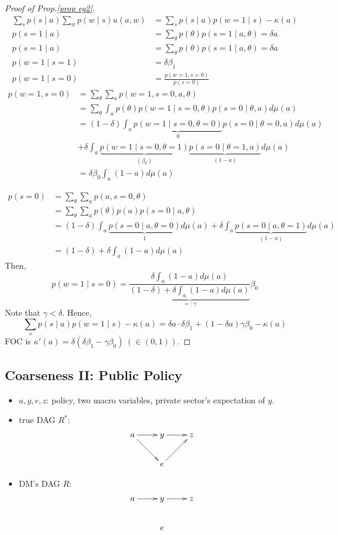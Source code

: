 \documentclass[11pt,a4paper,dvipdfmx]{article}
\theoremstyle{plain}
\begin{document}
\begin{proof}[Proof of Prop.\ref{prop eg2}]
\begin{align*}
\sum_s p(s \mid a) \sum_w p(w \mid s) u(a, w) &= \sum_s p(s \mid a) p(w=1 \mid s) - \kappa(a) \\
p(s=1 \mid a)
&= \sum_\theta p(\theta) p(s=1 \mid a, \theta) = \delta a \\
p(s=1 \mid a)
&= \sum_\theta p(\theta) p(s=1 \mid a, \theta) = \delta a \\
p(w=1 \mid s=1) &= \delta \beta_1 \\
p(w=1 \mid s=0)
&= \frac{p(w=1, s=0)}{p(s=0)}
\end{align*}
\begin{align*}
p(w=1, s=0)
&= \sum_\theta \sum_a p(w=1, s=0, a, \theta) \\
&= \sum_\theta \int_a p(\theta) p(w=1 \mid s=0, \theta) p(s=0 \mid \theta, a) d \mu(a) \\
&= (1 - \delta)\int_a \underbrace{p(w=1 \mid s=0, \theta=0)}_{0} p(s=0 \mid \theta=0, a) d \mu(a) \\
&+ \delta \int_a \underbrace{p(w=1 \mid s=0, \theta=1)}_{(\beta_0)} \underbrace{p(s=0 \mid \theta=1, a)}_{(1-a)} d \mu(a) \\
&= \delta \beta_0 \int_a (1-a)  d \mu(a)
\end{align*}

\begin{align*}
p(s=0)
&= \sum_\theta \sum_a p(a, s=0, \theta) \\
&= \sum_\theta \sum_a p(\theta) p(a) p(s=0 \mid a, \theta) \\
&= (1 - \delta) \int_a
\underbrace{ p(s=0 \mid a, \theta=0)}_{1} d \mu(a)
+ \delta \int_a
\underbrace{ p(s=0 \mid a, \theta=1)}_{(1 - a)} d \mu(a) \\
&= (1 - \delta) + \delta \int_a (1 - a) d \mu(a)
\end{align*}
Then,
\[
p(w=1 \mid s=0) = \underbrace{\frac{\delta \int_a (1-a)  d \mu(a)}{(1 - \delta) + \delta \int_a (1 - a) d \mu(a)}}_{=: \gamma} \beta_0
\]
Note that $\gamma < \delta$. Hence,
\[
\sum_s p(s \mid a) p(w=1 \mid s) - \kappa(a)
= \delta a \cdot \delta \beta_1 + (1 - \delta a) \gamma \beta_0 - \kappa(a)
\]
FOC is $\kappa'(a) = \delta(\delta \beta_1 - \gamma \beta_0) \ (\in (0,1))$. 
\end{proof}


\subsection{Coarseness II: Public Policy}
\begin{itemize}
	\item $a,y,e,z$: policy, two macro variables, private sector's expectation of $y$.
	\item true DAG $R^*:$
\[
\xymatrix{
	a \ar[r] \ar[rd] & y \ar[r] & z \\
	& e \ar[ru] & 
}
\]
	\item DM's DAG $R:$
\[
\xymatrix{
	a \ar[r]  & y \ar[r] & z \\
	& e & 
}
\]
\end{itemize}
\end{document}
